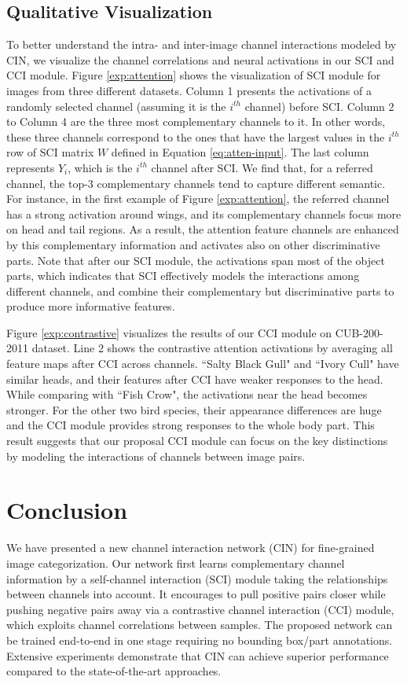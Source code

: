 \documentclass[letterpaper]{article} \usepackage{aaai20}  \usepackage{times}  \usepackage{helvet} \usepackage{courier}  \usepackage[hyphens]{url}  \usepackage{graphicx} \urlstyle{rm} \def\UrlFont{\rm}  \usepackage{graphicx}  \frenchspacing  \setlength{\pdfpagewidth}{8.5in}  \setlength{\pdfpageheight}{11in}  \usepackage{amsmath,amssymb}
\begin{document}
\subsection{Qualitative Visualization}
To better understand the intra- and inter-image channel interactions modeled by CIN, we visualize the channel correlations and neural activations in our SCI and CCI module. Figure \ref{exp:attention} shows the visualization of SCI module for images from three different datasets. Column 1 presents the activations of a randomly selected channel (assuming it is the $i^{th}$ channel) before SCI. Column 2 to Column 4 are the three most complementary channels to it.
In other words, these three channels correspond to the ones that have the largest values in the $i^{th}$ row of SCI matrix $W$ defined in Equation \ref{eq:atten-input}. The last column represents $Y_i$, which is the $i^{th}$ channel after SCI. We find that, for a referred channel, the top-3 complementary channels tend to capture different semantic.
For instance, in the first example of Figure \ref{exp:attention}, the referred channel has a strong activation around wings, and its complementary channels focus more on head and tail regions. As a result, the attention feature channels are enhanced by this complementary information and activates also on other discriminative parts.
Note that after our SCI module, the activations span most of the object parts, which indicates that SCI effectively models the interactions among different channels, and combine their complementary but discriminative parts to produce more informative features.

Figure \ref{exp:contrastive} visualizes the results of our CCI module on CUB-200-2011 dataset. Line 2 shows the contrastive attention activations by averaging all feature maps after CCI across channels. ``Salty Black Gull" and ``Ivory Cull" have similar heads, and their features after CCI have weaker responses to the head. While comparing with ``Fish Crow", the activations near the head becomes stronger. For the other two bird species, their appearance differences are huge and the CCI module
provides strong responses to the whole body part.
This result suggests that our proposal CCI module can focus on the key distinctions by modeling the interactions of channels between image pairs.


\section{Conclusion}
We have presented a new channel interaction network (CIN) for fine-grained image categorization. Our network first learns complementary channel information by a self-channel interaction (SCI) module taking the relationships between channels into account. It encourages to pull positive pairs closer while pushing negative pairs away via a contrastive channel interaction (CCI) module, which exploits channel correlations between samples. The proposed network can be trained end-to-end in one stage requiring no bounding box/part annotations. Extensive experiments demonstrate that CIN can achieve superior performance compared to the state-of-the-art approaches.

\begin{quote}
\begin{small}

\end{small}
\end{quote}
\end{document}
